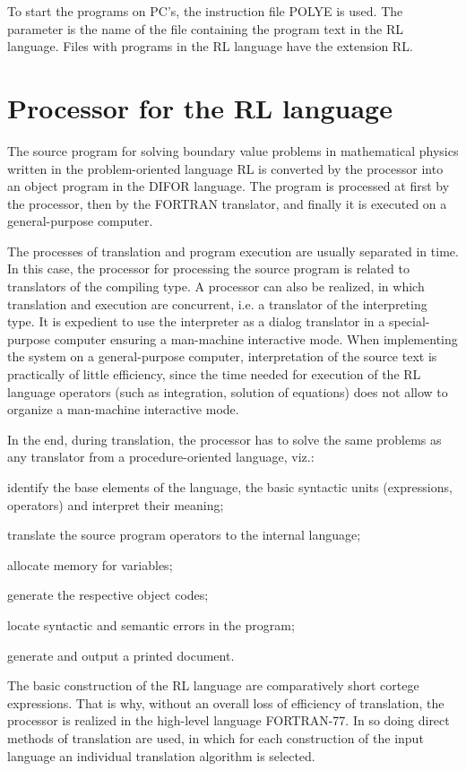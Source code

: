 To start the programs on PC's, the instruction file POLYE is used. The
parameter is the name of the file containing the program text in the RL
language. Files with programs in the RL language have the extension RL.

\section{Processor for the RL language}

The source program for solving boundary value problems in mathematical
physics written in the problem-oriented language RL is converted by the
processor into an object program in the DIFOR language. The program is
processed at first by the processor, then by the FORTRAN translator, and
finally it is executed on a general-purpose computer.

The processes of translation and program execution are usually separated in
time. In this case, the processor for processing the source program is
related to translators of the compiling type. A processor can also be
realized, in which translation and execution are concurrent, i.e. a
translator of the interpreting type. It is expedient to use the interpreter
as a dialog translator in a special-purpose computer ensuring a man-machine
interactive mode. When implementing the system on a general-purpose
computer, interpretation of the source text is practically of little
efficiency, since the time needed for execution of the RL language operators
(such as integration, solution of equations) does not allow to organize a
man-machine interactive mode.

In the end, during translation, the processor has to solve the same problems
as any translator from a procedure-oriented language, viz.:

identify the base elements of the language, the basic syntactic units
(expressions, operators) and interpret their meaning;

translate the source program operators to the internal language;

allocate memory for variables;

generate the respective object codes;

locate syntactic and semantic errors in the program;

generate and output a printed document.

The basic construction of the RL language are comparatively short cortege
expressions. That is why, without an overall loss of efficiency of
translation, the processor is realized in the high-level language
FORTRAN-77. In so doing direct methods of translation are used, in which for
each construction of the input language an individual translation algorithm
is selected.

